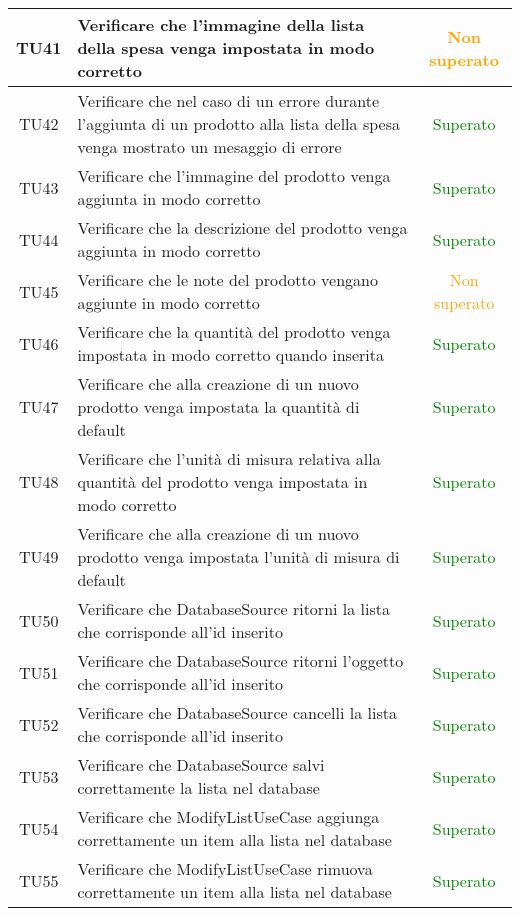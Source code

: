 \begin{center}
\begin{longtable}{|c|>{\centering}m{10cm}|c|}
		TU41 & Verificare che l'immagine della lista della spesa venga impostata in modo corretto & \textcolor{Orange}{Non superato}\\ \hline
		TU42 & Verificare che nel caso di un errore durante l'aggiunta di un prodotto alla lista della spesa venga mostrato un mesaggio di errore & \textcolor{Green}{Superato}\\ \hline
		TU43 & Verificare che l'immagine del prodotto venga aggiunta in modo corretto & \textcolor{Green}{Superato}\\ \hline
		TU44 & Verificare che la descrizione del prodotto venga aggiunta in modo corretto & \textcolor{Green}{Superato}\\ \hline
		TU45 & Verificare che le note del prodotto vengano aggiunte in modo corretto & \textcolor{Orange}{Non superato}\\ \hline
		TU46 & Verificare che la quantità del prodotto venga impostata in modo corretto quando inserita & \textcolor{Green}{Superato}\\ \hline
		TU47 & Verificare che alla creazione di un nuovo prodotto venga impostata la quantità di default & \textcolor{Green}{Superato}\\ \hline
		TU48 & Verificare che l'unità di misura relativa alla quantità del prodotto venga impostata in modo corretto & \textcolor{Green}{Superato}\\ \hline
		TU49 & Verificare che alla creazione di un nuovo prodotto venga impostata l'unità di misura di default & \textcolor{Green}{Superato}\\ \hline
		TU50 & Verificare che DatabaseSource ritorni la lista che corrisponde all'id inserito & \textcolor{Green}{Superato}\\ \hline
		TU51 & Verificare che DatabaseSource ritorni l'oggetto che corrisponde all'id inserito & \textcolor{Green}{Superato}\\ \hline
		TU52 & Verificare che DatabaseSource cancelli la lista che corrisponde all'id inserito & \textcolor{Green}{Superato}\\ \hline
		TU53 & Verificare che DatabaseSource salvi correttamente la lista nel database & \textcolor{Green}{Superato}\\ \hline
		TU54 & Verificare che ModifyListUseCase aggiunga correttamente un item alla lista nel database & \textcolor{Green}{Superato}\\ \hline
		TU55 & Verificare che ModifyListUseCase rimuova correttamente un item alla lista nel database & \textcolor{Green}{Superato}\\ \hline

\end{longtable}
\end{center}
